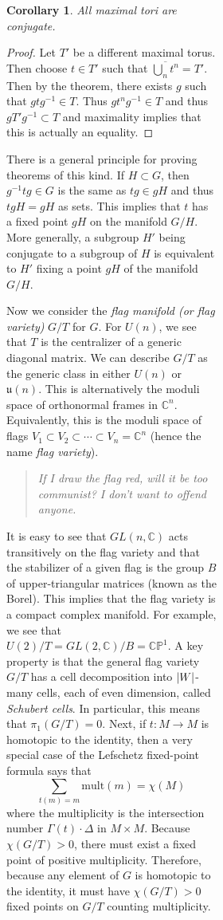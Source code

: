 \documentclass[leqno, openany]{memoir}
\newtheorem{cor}[thm]{Corollary}
\theoremstyle{definition}
\theoremstyle{remark}
\theoremstyle{plain}
\theoremstyle{definition}
\theoremstyle{remark}
\newcommand{\C}{\mathbb{C}}
\renewcommand{\P}{\mathbb{P}}
\newcommand{\mf}[1]{\mathfrak{#1}}
\newcommand{\mr}[1]{\mathrm{#1}}
\newcommand{\ol}[1]{\overline{#1}}
\begin{document}
\begin{figure}[H]
\begin{figure}[H]
\begin{figure}[H]
\begin{cor} All maximal tori are conjugate.  \end{cor}

\begin{proof} Let $T'$ be a different maximal torus. Then choose $t \in T'$
    such that $\ol{\bigcup_n t^n} = T'$. Then by the theorem, there exists $g$
    such that $gtg^{-1} \in T$. Thus $g t^n g^{-1} \in T$ and thus $g T' g^{-1}
    \subset T$ and maximality implies that this is actually an equality.
\end{proof}

There is a general principle for proving theorems of this kind. If $H \subset
G$, then $g^{-1} t g \in G$ is the same as $tg \in gH$ and thus $tgH = gH$ as
sets. This implies that $t$ has a fixed point $gH$ on the manifold $G/H$. More
generally, a subgroup $H'$ being conjugate to a subgroup of $H$ is equivalent
to $H'$ fixing a point $gH$ of the manifold $G/H$.

Now we consider the \textit{flag manifold (or flag variety)} $G/T$ for $G$. For
$U(n)$, we see that $T$ is the centralizer of a generic diagonal matrix. We can
describe $G/T$ as the generic class in either $U(n)$ or $\mf{u}(n)$. This is
alternatively the moduli space of orthonormal frames in $\C^n$. Equivalently,
this is the moduli space of flags $V_1 \subset V_2 \subset \cdots \subset V_n =
\C^n$ (hence the name \textit{flag variety}).

\begin{quotation} \itshape If I draw the flag red, will it be too communist? I
don't want to offend anyone.  \end{quotation}

It is easy to see that $GL(n, \C)$ acts transitively on the flag variety and
that the stabilizer of a given flag is the group $B$ of upper-triangular
matrices (known as the Borel). This implies that the flag variety is a compact
complex manifold. For example, we see that $U(2)/T = GL(2, \C) / B = \C\P^1$. A
key property is that the general flag variety $G/T$ has a cell decomposition
into $\abs{W}$-many cells, each of even dimension, called \textit{Schubert
cells}. In particular, this means that $\pi_1(G/T) = 0$. Next, if $t \colon M
\to M$ is homotopic to the identity, then a very special case of the Lefschetz
fixed-point formula says that \[ \sum_{t(m) = m} \mr{mult}(m) = \chi(M) \]
where the multiplicity is the intersection number $\Gamma(t) \cdot \Delta$ in
$M \times M$. Because $\chi(G/T) > 0$, there must exist a fixed point of
positive multiplicity. Therefore, because any element of $G$ is homotopic to
the identity, it must have $\chi(G/T) >0$ fixed points on $G/T$ counting
multiplicity.


\end{figure}
\end{figure}
\end{figure}
\end{document}
